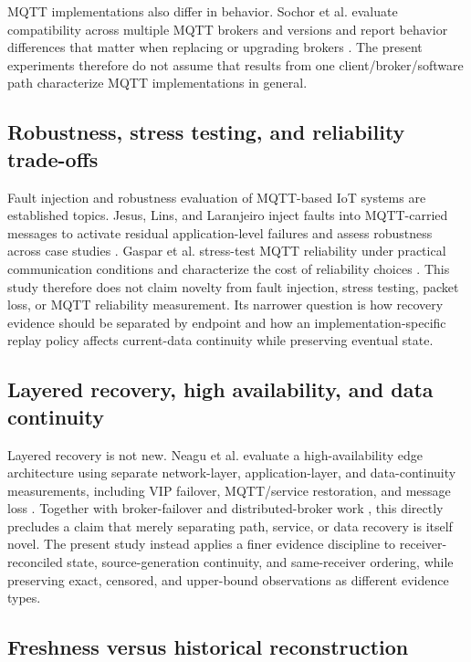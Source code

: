 \documentclass[journal]{IEEEtran}
\begin{document}
MQTT implementations also differ in behavior. Sochor et al. evaluate compatibility across multiple MQTT brokers and versions and report behavior differences that matter when replacing or upgrading brokers \cite{sochor2021}. The present experiments therefore do not assume that results from one client/broker/software path characterize MQTT implementations in general.

\subsection{Robustness, stress testing, and reliability trade-offs}

Fault injection and robustness evaluation of MQTT-based IoT systems are established topics. Jesus, Lins, and Laranjeiro inject faults into MQTT-carried messages to activate residual application-level failures and assess robustness across case studies \cite{jesus2025}. Gaspar et al. stress-test MQTT reliability under practical communication conditions and characterize the cost of reliability choices \cite{gaspar2026}. This study therefore does not claim novelty from fault injection, stress testing, packet loss, or MQTT reliability measurement. Its narrower question is how recovery evidence should be separated by endpoint and how an implementation-specific replay policy affects current-data continuity while preserving eventual state.

\subsection{Layered recovery, high availability, and data continuity}

Layered recovery is not new. Neagu et al. evaluate a high-availability edge architecture using separate network-layer, application-layer, and data-continuity measurements, including VIP failover, MQTT/service restoration, and message loss \cite{neagu2026}. Together with broker-failover and distributed-broker work \cite{chen2020,kamoun2024}, this directly precludes a claim that merely separating path, service, or data recovery is itself novel. The present study instead applies a finer evidence discipline to receiver-reconciled state, source-generation continuity, and same-receiver ordering, while preserving exact, censored, and upper-bound observations as different evidence types.

\subsection{Freshness versus historical reconstruction}
\end{document}
